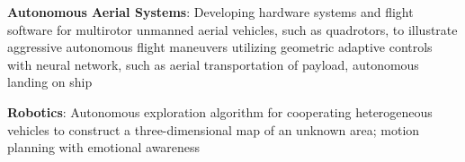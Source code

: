 \documentclass[10pt]{article}
\begin{document}
\begin{list}{}

\item \textbf{Autonomous Aerial Systems}: Developing hardware systems and flight software for multirotor unmanned aerial vehicles, such as quadrotors, to illustrate aggressive autonomous flight maneuvers utilizing geometric adaptive controls with neural network, such as aerial transportation of payload, autonomous landing on ship

\item \textbf{Robotics}: Autonomous exploration algorithm for cooperating heterogeneous vehicles to construct a three-dimensional map of an unknown area; motion planning with emotional awareness

\end{list}


\clearpage\newpage
\end{document}

